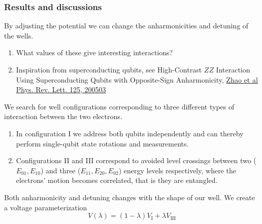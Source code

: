 \documentclass{beamer}
\begin{document}
\begin{frame}
\frametitle{Results and discussions}

By adjusting the potential we can change the anharmonicities and detuning of the wells.
\begin{enumerate}
\item What values of these give interesting interactions?

\item Inspiration from superconducting qubits, see High-Contrast $ZZ$ Interaction Using Superconducting Qubits with Opposite-Sign Anharmonicity, \href{{https://journals.aps.org/prl/abstract/10.1103/PhysRevLett.125.200503}}{Zhao et al Phys. Rev. Lett. 125, 200503}
\end{enumerate}

\noindent
\end{frame}

\begin{frame}

We search for well configurations corresponding to three different types of interaction between the two electrons.

\begin{enumerate}
\item In configuration I we address both qubits independently and can thereby perform single-qubit state rotations and measurements.

\item Configurations II and III correspond to avoided level crossings between two ($E_{01}, E_{10}$) and three ($E_{11}, E_{20}, E_{02}$) energy levels respectively, where the electrons' motion becomes correlated, that is they are entangled. 
\end{enumerate}

\noindent
Both anharmonicity and detuning changes with the shape of our well.
We create a voltage parameterization
\begin{equation}
V(\lambda) = (1-\lambda)V_\mathrm{I} + \lambda V_\mathrm{III}
\end{equation}
\end{frame}
\end{document}
